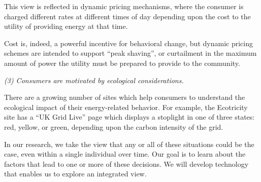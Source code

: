 This view is reflected in dynamic pricing mechanisms, where the consumer is
charged different rates at different times of day depending upon the cost
to the utility of providing energy at that time.

Cost is, indeed, a powerful incentive for behavioral change, but dynamic
pricing schemes are intended to support ``peak shaving'', or curtailment in
the maximum amount of power the utility must be prepared to provide to the
community.

{\em (3) Consumers are motivated by ecological considerations.}

There are a growing number of sites which help consumers to understand the
ecological impact of their energy-related behavior.  For example, the
Ecotricity site has a ``UK Grid Live'' page which displays a stoplight in
one of three states: red, yellow, or green, depending upon the carbon
intensity of the grid.  

In our research, we take the view that any or all of these situations could
be the case, even within a single individual over time. Our goal is to
learn about the factors that lead to one or more of these decisions. We
will develop technology that enables us to explore an integrated view.









